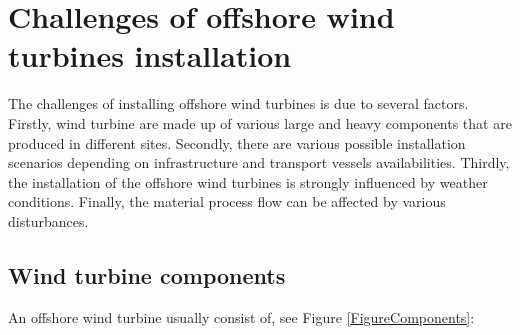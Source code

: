 \section{Challenges of offshore wind turbines installation}
The challenges of installing offshore wind turbines is due to several factors. Firstly, wind turbine are made up of various large and heavy components that are produced in different sites. Secondly, there are various possible installation scenarios depending on infrastructure and transport vessels availabilities. Thirdly, the installation of the offshore wind turbines is strongly influenced by weather conditions.  
Finally, the material process flow can be affected by various disturbances.

\subsection{Wind turbine components}
An offshore wind turbine usually consist of, see Figure \ref{FigureComponents}:

